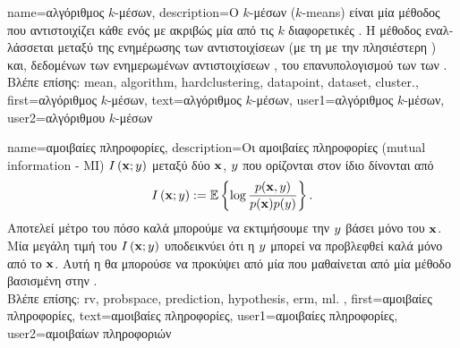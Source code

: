 {name={\foreignlanguage{greek}{αλγόριθμος $k$-μέσων}}, 
	description={\foreignlanguage{greek}{Ο} 
		 $k$-\foreignlanguage{greek}{μέσων} 
		($k$-means) \foreignlanguage{greek}{είναι μία μέθοδος}  \foreignlanguage{greek}{που αντιστοιχίζει κάθε} 
		 \foreignlanguage{greek}{ενός}  
		\foreignlanguage{greek}{με ακριβώς μία από τις $k$ διαφορετικές} . \foreignlanguage{greek}{Η μέθοδος εναλλάσσεται
		μεταξύ της ενημέρωσης των αντιστοιχίσεων}  
		\foreignlanguage{greek}{(με τη}  \foreignlanguage{greek}{με την πλησιέστερη} ) 
		\foreignlanguage{greek}{και, δεδομένων των ενημερωμένων αντιστοιχίσεων} 
		, \foreignlanguage{greek}{του επανυπολογισμού των}  \foreignlanguage{greek}{των} 
		 \cite[\foreignlanguage{greek}{Κεφ.} 8]{MLBasics}.\\
	\foreignlanguage{greek}{Βλέπε επίσης:} \gls{mean}, \gls{algorithm}, \gls{hardclustering}, \gls{datapoint}, \gls{dataset}, \gls{cluster}.},
	first={\foreignlanguage{greek}{αλγόριθμος $k$-μέσων}},
	text={\foreignlanguage{greek}{αλγόριθμος $k$-μέσων}},
	user1={\foreignlanguage{greek}{αλγόριθμος $k$-μέσων}}, %
	user2={\foreignlanguage{greek}{αλγόριθμου $k$-μέσων}} %
}

{name={\foreignlanguage{greek}{αμοιβαίες πληροφορίες}},
 description={\foreignlanguage{greek}{Οι} \foreignlanguage{greek}{αμοιβαίες πληροφορίες} 
 	(mutual information - MI) $I \left( {\bf x};y\right)$ 
 	\foreignlanguage{greek}{μεταξύ δύο}  ${\bf x}$, $y$ \foreignlanguage{greek}{που ορίζονται στον ίδιο} 
	 \foreignlanguage{greek}{δίνονται από}
 	\cite{coverthomas} $$I \left( {\bf x};y\right) := 
	\mathbb{E} \left\{ \log \frac{p ({\bf x},y)}{p({\bf x})p(y)} \right\}.$$ 
	\foreignlanguage{greek}{Αποτελεί μέτρο του πόσο καλά μπορούμε να εκτιμήσουμε την} $y$ \foreignlanguage{greek}{βάσει 
	μόνο του} ${\bf x}$. \foreignlanguage{greek}{Μία μεγάλη τιμή του} $I \left( {\bf x};y\right)$ 
	\foreignlanguage{greek}{υποδεικνύει ότι η} $y$ \foreignlanguage{greek}{μπο\-ρεί να προβλεφθεί καλά μόνο από το} ${\bf x}$. 
	\foreignlanguage{greek}{Αυτή η}  \foreignlanguage{greek}{θα μπορούσε να προκύψει από μία} 
	 \foreignlanguage{greek}{που μαθαίνεται από μία μέθοδο}  
	\foreignlanguage{greek}{βασισμένη στην} .\\
	\foreignlanguage{greek}{Βλέπε επίσης:} \gls{rv}, \gls{probspace}, \gls{prediction}, \gls{hypothesis}, \gls{erm}, \gls{ml}.
	 }, first={\foreignlanguage{greek}{αμοιβαίες πληροφορίες}}, 
	 text={\foreignlanguage{greek}{αμοιβαίες πληροφορίες}},
	 user1={\foreignlanguage{greek}{αμοιβαίες πληροφορίες}}, %
	 user2={\foreignlanguage{greek}{αμοιβαίων πληροφοριών}} %
}
        
